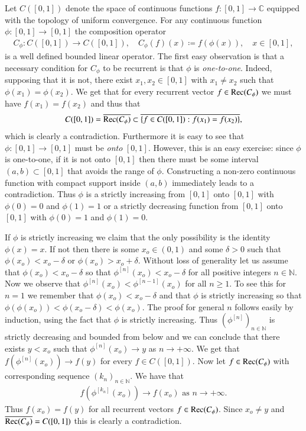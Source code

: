 \documentclass[12pt,leqno]{amsart}
\theoremstyle{plain}
\theoremstyle{definition}
\numberwithin{equation}{section}
\begin{document}
Let $C([0,1])$ denote the space of continuous functions $f:[0,1]\to \mathbb C$ equipped with the topology of uniform convergence. For any continuous function $\phi:[0,1]\to [0,1]$ the composition operator 
\begin{align*}
	C_\phi:C([0,1])\to C([0,1]), \quad C_\phi(f)(x)\coloneqq f(\phi(x)),\quad x\in[0,1], 
\end{align*}
is a well defined bounded linear operator. The first easy observation is that a necessary condition for $C_\phi$ to be recurrent is that $\phi$ is \emph{one-to-one}. Indeed, supposing that it is not, there exist $x_1,x_2\in[0,1]$ with $x_1\neq x_2$ such that $\phi(x_1)=\phi(x_2)$. We get that for every recurrent vector $f\in {\textnormal{Rec}}(C_\phi)$ we must have $f(x_1)=f(x_2)$ and thus that 
\begin{align*}
	C([0,1])=\overline{{\textnormal{Rec}}(C_\phi)}\subset \overline{\{f\in C([0,1]):f(x_1)=f(x_2)\}} , 
\end{align*}
which is clearly a contradiction. Furthermore it is easy to see that $\phi:[0,1]\to[0,1]$ must be \emph{onto} $[0,1]$. However, this is an easy exercise: since $\phi$ is one-to-one, if it is not onto $[0,1]$ then there must be some interval $(a,b)\subset [0,1]$ that avoids the range of $\phi$. Constructing a non-zero continuous function with compact support inside $(a,b)$ immediately leads to a contradiction. Thus $\phi$ is a strictly increasing from $[0,1]$ onto $[0,1]$ with $\phi(0)=0$ and $\phi(1)=1$ or a strictly decreasing function from $[0,1]$ onto $[0,1]$ with $\phi(0)=1$ and $\phi(1)=0$.

If $\phi$ is strictly increasing we claim that the only possibility is the identity $\phi(x)=x$. If not then there is some $x_o\in(0,1)$ and some $\delta>0$ such that $\phi(x_o)<x_o-\delta$ or $\phi(x_o)>x_o+\delta$. Without loss of generality let us assume that $\phi(x_o)<x_o-\delta$ so that $\phi^{[n]}(x_o)<x_o-\delta$ for all positive integers $n\in\mathbb N$. Now we observe that $\phi^{[n]}(x_o)<\phi^{[n-1]}(x_o)$ for all $n\geq 1$. To see this for $n=1$ we remember that $\phi(x_o)<x_o-\delta$ and that $\phi$ is strictly increasing so that $\phi(\phi(x_o)) <\phi(x_o-\delta)<\phi(x_o)$. The proof for general $n$ follows easily by induction, using the fact that $\phi$ is strictly increasing. Thus $(\phi^{[n]})_{n\in\mathbb N}$ is strictly decreasing and bounded from below and we can conclude that there exists $y< x_o$ such that $\phi^{[n]}(x_o)\to y$ as $n\to +\infty$. We get that $f(\phi^{[n]}(x_o))\to f(y)$ for every $f\in C([0,1])$. Now let $f\in {\textnormal{Rec}}(C_\phi)$ with corresponding sequence $(k_n)_{n\in\mathbb N}$. We have that 
\begin{align*}
	f(\phi^{[k_n]}(x_o))\to f(x_o)\text{ as }n\to+\infty. 
\end{align*}
Thus $f(x_o)=f(y)$ for all recurrent vectors $f\in{\textnormal{Rec}}(C_\phi)$. Since $x_o\neq y$ and $\overline{{\textnormal{Rec}}(C_\phi)}=C([0,1])$ this is clearly a contradiction.
\end{document}
